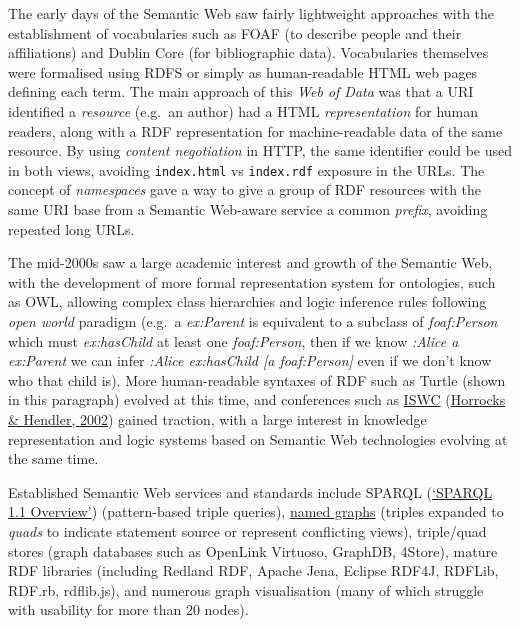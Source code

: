The early days of the Semantic Web saw fairly lightweight approaches with the establishment of vocabularies such as FOAF (to describe people and their affiliations) and Dublin Core (for bibliographic data). Vocabularies themselves were formalised using RDFS or simply as human-readable HTML web pages defining each term. The main approach of this \emph{Web of Data} was that a URI identified a \emph{resource} (e.g.~an author) had a HTML \emph{representation} for human readers, along with a RDF representation for machine-readable data of the same resource. By using \emph{content negotiation} in HTTP, the same identifier could be used in both views, avoiding \texttt{index.html} vs \texttt{index.rdf} exposure in the URLs. The concept of \emph{namespaces} gave a way to give a group of RDF resources with the same URI base from a Semantic Web-aware service a common \emph{prefix}, avoiding repeated long URLs.

The mid-2000s saw a large academic interest and growth of the Semantic Web, with the development of more formal representation system for ontologies, such as OWL, allowing complex class hierarchies and logic inference rules following \emph{open world} paradigm (e.g.~a \emph{ex:Parent} is equivalent to a subclass of \emph{foaf:Person} which must \emph{ex:hasChild} at least one \emph{foaf:Person}, then if we know \emph{:Alice a ex:Parent} we can infer \emph{:Alice ex:hasChild {[}a foaf:Person{]}} even if we don't know who that child is). More human-readable syntaxes of RDF such as Turtle (shown in this paragraph) evolved at this time, and conferences such as \href{https://iswc2022.semanticweb.org/}{ISWC} (\protect\hyperlink{ref-yd2WE9eq}{Horrocks \& Hendler, 2002}) gained traction, with a large interest in knowledge representation and logic systems based on Semantic Web technologies evolving at the same time.

Established Semantic Web services and standards include SPARQL (\protect\hyperlink{ref-xww8fb1B}{{`SPARQL 1.1 Overview'}}) (pattern-based triple queries), \href{https://www.w3.org/TR/rdf11-concepts/\#section-dataset}{named graphs} (triples expanded to \emph{quads} to indicate statement source or represent conflicting views), triple/quad stores (graph databases such as OpenLink Virtuoso, GraphDB, 4Store), mature RDF libraries (including Redland RDF, Apache Jena, Eclipse RDF4J, RDFLib, RDF.rb, rdflib.js), and numerous graph visualisation (many of which struggle with usability for more than 20 nodes).


